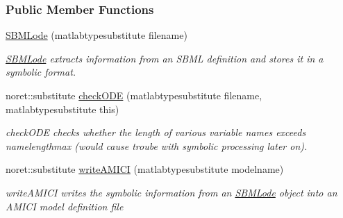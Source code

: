 \subsubsection*{Public Member Functions}
\begin{DoxyCompactItemize}
\item 
\hyperlink{class_s_b_m_lode_a2cd0d930d07eaf96753131799d7bdc9c}{S\+B\+M\+Lode} (matlabtypesubstitute filename)
\begin{DoxyCompactList}\small\item\em \hyperlink{class_s_b_m_lode}{S\+B\+M\+Lode} extracts information from an S\+B\+ML definition and stores it in a symbolic format. \end{DoxyCompactList}\item 
\mbox{\label{class_s_b_m_lode_aade8af59a084facb7787bec29226682f}} 
noret\+::substitute \hyperlink{class_s_b_m_lode_aade8af59a084facb7787bec29226682f}{check\+O\+DE} (matlabtypesubstitute filename, matlabtypesubstitute this)
\begin{DoxyCompactList}\small\item\em check\+O\+DE checks whether the length of various variable names exceeds namelengthmax (would cause troube with symbolic processing later on). \end{DoxyCompactList}\item 
noret\+::substitute \hyperlink{class_s_b_m_lode_af2ebf8afc99040060a0af5b3ec3632a7}{write\+A\+M\+I\+CI} (matlabtypesubstitute modelname)
\begin{DoxyCompactList}\small\item\em write\+A\+M\+I\+CI writes the symbolic information from an \hyperlink{class_s_b_m_lode}{S\+B\+M\+Lode} object into an A\+M\+I\+CI model definition file \end{DoxyCompactList}\end{DoxyCompactItemize}

